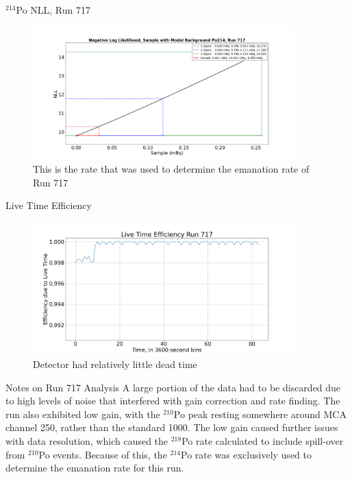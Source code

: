 \documentclass[aspectratio=169]{beamer}
\begin{document}
\begin{frame}{$^{214}$Po NLL, Run 717}
    \begin{figure}
        \begin{center}
            \includegraphics[width=0.9\textwidth]
            {assets/717/NLL214.png}
            \caption{This is the rate that was used to determine the emanation rate of Run 717}
        \end{center}
    \end{figure}
\end{frame}

\begin{frame}{Live Time Efficiency}
    \begin{figure}
        \begin{center}
            \includegraphics[width=0.9\textwidth]
            {assets/717/LTE.png}
            \caption{Detector had relatively little dead time}
        \end{center}
    \end{figure}
\end{frame}

\begin{frame}{Notes on Run 717 Analysis}
    A large portion of the data had to be discarded due to high levels of noise that interfered
    with gain correction and rate finding.
    The run also exhibited low gain, with the $^{210}$Po peak resting somewhere around MCA channel
    250, rather than the standard 1000.
    The low gain caused further issues with data resolution, which caused the $^{218}$Po rate calculated
    to include spill-over from $^{210}$Po events.
    Because of this, the $^{214}$Po rate was exclusively used to determine the emanation rate for this run.

    \hyperlink{RvT_717}{}
\end{frame}
\end{document}
